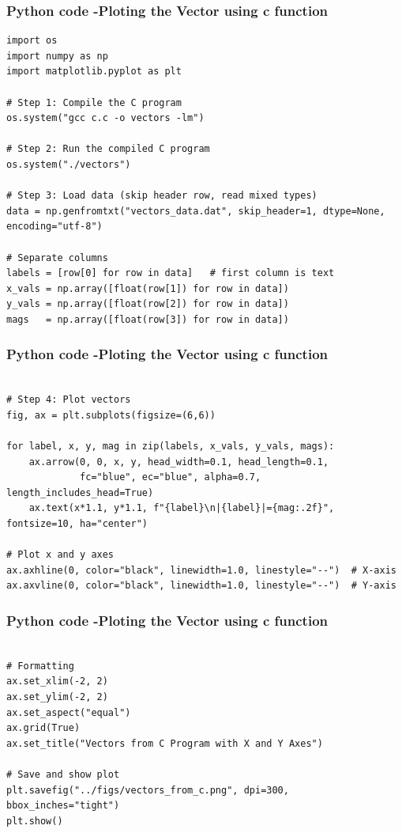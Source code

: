 \documentclass{beamer}
\begin{document}
	
\begin{frame}[fragile]                              
	\frametitle{Python code -Ploting the Vector using c function} 
	\begin{lstlisting}
import os
import numpy as np
import matplotlib.pyplot as plt

# Step 1: Compile the C program
os.system("gcc c.c -o vectors -lm")

# Step 2: Run the compiled C program
os.system("./vectors")

# Step 3: Load data (skip header row, read mixed types)
data = np.genfromtxt("vectors_data.dat", skip_header=1, dtype=None, encoding="utf-8")

# Separate columns
labels = [row[0] for row in data]   # first column is text
x_vals = np.array([float(row[1]) for row in data])
y_vals = np.array([float(row[2]) for row in data])
mags   = np.array([float(row[3]) for row in data])
\end{lstlisting}
\end{frame}

	
\begin{frame}[fragile]                              
	\frametitle{Python code -Ploting the Vector using c function} 
	\begin{lstlisting}

# Step 4: Plot vectors
fig, ax = plt.subplots(figsize=(6,6))

for label, x, y, mag in zip(labels, x_vals, y_vals, mags):
    ax.arrow(0, 0, x, y, head_width=0.1, head_length=0.1,
             fc="blue", ec="blue", alpha=0.7, length_includes_head=True)
    ax.text(x*1.1, y*1.1, f"{label}\n|{label}|={mag:.2f}", fontsize=10, ha="center")

# Plot x and y axes
ax.axhline(0, color="black", linewidth=1.0, linestyle="--")  # X-axis
ax.axvline(0, color="black", linewidth=1.0, linestyle="--")  # Y-axis
\end{lstlisting}
\end{frame}

	
\begin{frame}[fragile]                              
	\frametitle{Python code -Ploting the Vector using c function} 
	\begin{lstlisting}

# Formatting
ax.set_xlim(-2, 2)
ax.set_ylim(-2, 2)
ax.set_aspect("equal")
ax.grid(True)
ax.set_title("Vectors from C Program with X and Y Axes")

# Save and show plot
plt.savefig("../figs/vectors_from_c.png", dpi=300, bbox_inches="tight")
plt.show()


\end{lstlisting}                               
\end{frame}
\end{document}
